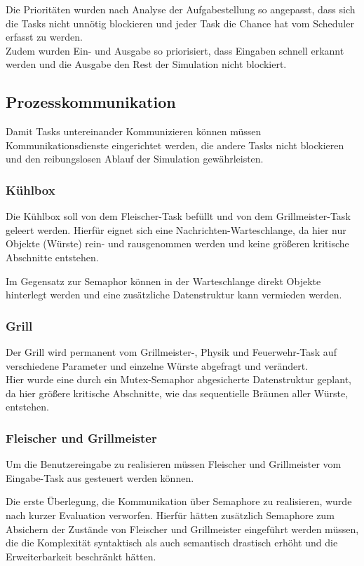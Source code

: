 Die Prioritäten wurden nach Analyse der Aufgabestellung so angepasst, dass sich die Tasks nicht unnötig blockieren und jeder Task die Chance hat vom Scheduler erfasst zu werden.\\
Zudem wurden Ein- und Ausgabe so priorisiert, dass Eingaben schnell erkannt werden und die Ausgabe den Rest der Simulation nicht blockiert.

\subsection{Prozesskommunikation}

Damit Tasks untereinander Kommunizieren können müssen Kommunikationsdienste eingerichtet werden, die andere Tasks nicht blockieren und den reibungslosen Ablauf der Simulation gewährleisten.

\subsubsection{Kühlbox}

Die Kühlbox soll von dem Fleischer-Task befüllt und von dem Grillmeister-Task geleert werden.
Hierfür eignet sich eine Nachrichten-Warteschlange, da hier nur Objekte (Würste) rein- und rausgenommen werden
und keine größeren kritische Abschnitte entstehen.

Im Gegensatz zur Semaphor können in der Warteschlange direkt Objekte hinterlegt werden und eine zusätzliche Datenstruktur kann vermieden werden.

\subsubsection{Grill}

Der Grill wird permanent vom Grillmeister-, Physik und Feuerwehr-Task auf verschiedene Parameter und einzelne Würste abgefragt und verändert.\\
Hier wurde eine durch ein Mutex-Semaphor abgesicherte Datenstruktur geplant, da hier größere kritische Abschnitte,
wie das sequentielle Bräunen aller Würste, entstehen.

\subsubsection{Fleischer und Grillmeister}

Um die Benutzereingabe zu realisieren müssen Fleischer und Grillmeister vom Eingabe-Task aus gesteuert werden können.

Die erste Überlegung, die Kommunikation über Semaphore zu realisieren, wurde nach kurzer Evaluation verworfen.
Hierfür hätten zusätzlich Semaphore zum Absichern der Zustände von Fleischer und Grillmeister eingeführt werden müssen,
die die Komplexität syntaktisch als auch semantisch drastisch erhöht und die Erweiterbarkeit beschränkt hätten.

